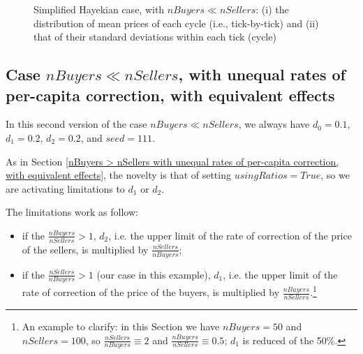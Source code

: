 \documentclass[10pt]{report}
\begin{document}
\begin{appendices}
\begin{figure}[H]
\begin{center}
\caption{Simplified Hayekian case, with $nBuyers \ll nSellers$: (i) the distribution of mean prices of each cycle (i.e., tick-by-tick) and (ii) that of their standard deviations within each tick (cycle)}
\label{output_3_3b.png}
\end{center}
\end{figure}



\subsection{Case $nBuyers \ll nSellers$, with unequal rates of per-capita correction, with equivalent effects}\label{nBuyers < nSellers with unequal rates of per-capita correction, with equivalent effects}

In this second version of the case $nBuyers \ll nSellers$, we always have $d_0=0.1$, $d_1=0.2$,  $d_2=0.2$, and $seed=111$.

As in Section \ref{nBuyers > nSellers with unequal rates of per-capita correction, with equivalent effects}, the novelty is that of setting $usingRatios=True$, so we are activating limitations to $d_1$ or $d_2$.

The limitations work as follow:
\begin{itemize}

\item if the $\frac{nBuyers}{nSellers}>1$, $d_2$, i.e. the upper limit of the rate of correction of the price of the sellers, is multiplied by $\frac{nSellers}{nBuyers}$;

\item if the $\frac{nSellers}{nBuyers}>1$ (our case in this example), $d_1$, i.e. the upper limit of the rate of correction of the price of the buyers, is multiplied by $\frac{nBuyers}{nSellers}$.\footnote{An example to clarify: in this Section we have $nBuyers=50$ and $nSellers=100$, so $\frac{nSellers}{nBuyers} \equiv 2$ and $\frac{nBuyers}{nSellers} \equiv0.5$; $d_1$ is reduced of the 50\%.}


\end{itemize}
\end{appendices}
\end{document}
